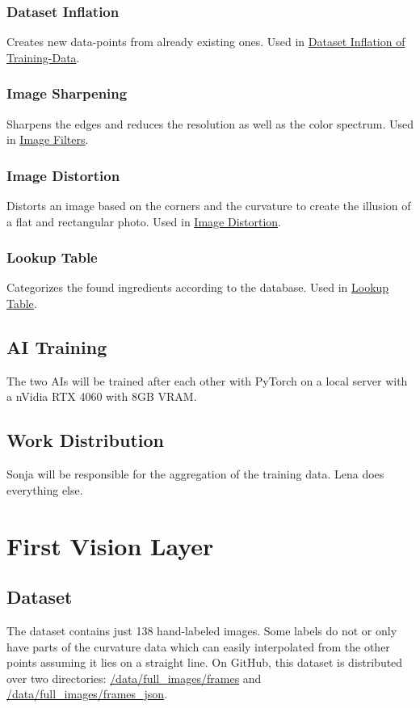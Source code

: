 \documentclass[a4paper,11pt]{report}
\begin{document}
            \subsection{Dataset Inflation}
                Creates new data-points from already existing ones. Used in \hyperref[subsec:data:inflation]{Dataset Inflation of Training-Data}.

            \subsection{Image Sharpening}
                Sharpens the edges and reduces the resolution as well as the color spectrum. Used in \hyperref[subsec:architecture:filters]{Image Filters}.

            \subsection{Image Distortion}
                Distorts an image based on the corners and the curvature to create the illusion of a flat and rectangular photo. Used in \hyperref[subsec:architecture:distortion]{Image Distortion}.

            \subsection{Lookup Table}
                Categorizes the found ingredients according to the database. Used in \hyperref[subsec:architecture:table]{Lookup Table}.

        \section{AI Training}
            The two AIs will be trained after each other with PyTorch \cite{pytorch} on a local server with a nVidia RTX 4060 with 8GB VRAM.

        \section{Work Distribution}
            Sonja will be responsible for the aggregation of the training data. Lena does everything else.
            
            
    \chapter{First Vision Layer}
    
        \section{Dataset}
            The dataset contains just 138 hand-labeled images. Some labels do not or only have parts of the curvature data which can easily interpolated from the other points assuming it lies on a straight line. On GitHub, this dataset is distributed over two directories: \href{https://github.com/lenamerkli/ingredient-scanner/tree/main/data/full_images/frames}{/data/full\_images/frames} and \href{https://github.com/lenamerkli/ingredient-scanner/tree/main/data/full_images/frames_json}{/data/full\_images/frames\_json}.
    
\end{document}
